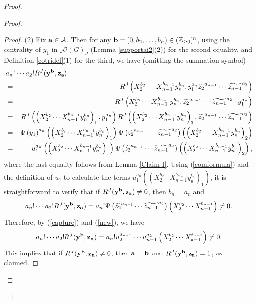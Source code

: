 \documentclass{amsart}
\numberwithin{equation}{section}
\theoremstyle{definition}
\begin{document}
\begin{proof}
\begin{proof}
\begin{proof}
(2) Fix ${\bf a} \in \mathcal{A}$. Then for any ${\bf b} = (0,b_2, \ldots , b_n)\in (\mathbb{Z}_{\geq 0})^{n}$, using the centrality of $y_1$ in ${}_J\mathcal{O}(G)_J$ (Lemma \ref{supportai2}(2)) for the second equality, and Definition \ref{cotridef}(1) for the third, we have (omitting the summation symbol)
\begin{eqnarray*}
\lefteqn{a_n!\cdots a_2!R^J({\bf y}^{{\bf b}},{\bf z}_{{\bf a}})}\\
& = & R^J\left(X_2^{b_2}\cdots X_{n-1}^{b_{n-1}}y_n^{b_n},y_1^{a_n}\widetilde{z_2}^{a_{n-1}}\cdots \widetilde{z_{n-1}}^{a_2}\right)\\
& = & R^J\left(X_2^{b_2}\cdots X_{n-1}^{b_{n-1}}y_n^{b_n}, \widetilde{z_2}^{a_{n-1}}\cdots \widetilde{z_{n-1}}^{a_2}\cdot y_1^{a_n}\right)\\
& = & R^J\left(\left( X_2^{b_2}\cdots X_{n-1}^{b_{n-1}}y_n^{b_n}\right)_1,y_1^{a_n}\right)R^J\left(\left( X_2^{b_2}\cdots X_{n-1}^{b_{n-1}}y_n^{b_n}\right)_2, \widetilde{z_2}^{a_{n-1}}\cdots \widetilde{z_{n-1}}^{a_2}\right)\\
& = & \Psi \left(y_1\right)^{a_n}\left(\left( X_2^{b_2}\cdots X_{n-1}^{b_{n-1}}y_n^{b_n}\right)_1\right)\Psi\left(\widetilde{z_2}^{a_{n-1}}\cdots \widetilde{z_{n-1}}^{a_2}\right)\left(\left( X_2^{b_2}\cdots X_{n-1}^{b_{n-1}}y_n^{b_n}\right)_2\right)\\
& = & u_1^{a_n}\left(\left( X_2^{b_2}\cdots X_{n-1}^{b_{n-1}}y_n^{b_n}\right)_1\right)\Psi\left(\widetilde{z_2}^{a_{n-1}}\cdots \widetilde{z_{n-1}}^{a_2}\right)\left(\left( X_2^{b_2}\cdots X_{n-1}^{b_{n-1}}y_n^{b_n}\right)_2\right),
\end{eqnarray*}
where the last equality follows from Lemma \ref{Claim I}. Using (\ref{comformula}) and the definition of $u_1$ to calculate the terms $u_1^{a_n}\left(\left( X_2^{b_2}\cdots X_{n-1}^{b_{n-1}}y_n^{b_n}\right)_1\right)$, it is straightforward to verify that if $R^J({\bf y}^{{\bf b}},{\bf z}_{{\bf a}})\ne 0$, then $b_n=a_n$ and  
$$a_n!\cdots a_2!R^J({\bf y}^{{\bf b}},{\bf z}_{{\bf a}})=a_n! \Psi \left(\widetilde{z_2}^{a_{n-1}}\cdots \widetilde{z_{n-1}}^{a_2}\right)\left(X_2^{b_2}\cdots X_{n-1}^{b_{n-1}}\right)\ne 0.
$$
Therefore, by (\ref{capture}) and (\ref{new}), we have
$$a_n!\cdots a_2!R^J({\bf y}^{{\bf b}},{\bf z}_{{\bf a}})=a_n!u_2^{a_{n-1}}\cdots u_{n-1}^{a_2}\left(X_2^{b_2}\cdots X_{n-1}^{b_{n-1}}\right)\ne 0.
$$
This implies that if $R^J({\bf y}^{{\bf b}},{\bf z}_{{\bf a}})\ne 0$, then ${\bf a}={\bf b}$ and $R^J({\bf y}^{{\bf b}},{\bf z}_{{\bf a}})=1$, as claimed.
\end{proof}


\end{proof}
\end{proof}
\end{document}
